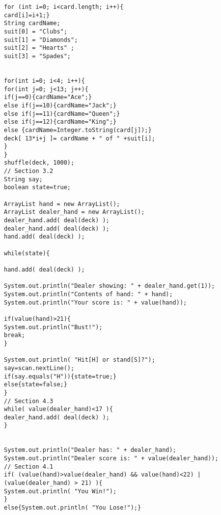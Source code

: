 \documentclass[english]{article}
\begin{document}
\begin{verbatim}
for (int i=0; i<card.length; i++){
card[i]=i+1;} 
String cardName;
suit[0] = "Clubs";
suit[1] = "Diamonds";
suit[2] = "Hearts" ;
suit[3] = "Spades";


for(int i=0; i<4; i++){
for(int j=0; j<13; j++){
if(j==0){cardName="Ace";}
else if(j==10){cardName="Jack";}
else if(j==11){cardName="Queen";}
else if(j==12){cardName="King";}
else {cardName=Integer.toString(card[j]);}
deck[ 13*i+j ]= cardName + " of " +suit[i];
}
}
shuffle(deck, 1000);
// Section 3.2
String say;
boolean state=true;

ArrayList hand = new ArrayList();
ArrayList dealer_hand = new ArrayList();
dealer_hand.add( deal(deck) );
dealer_hand.add( deal(deck) );
hand.add( deal(deck) );

while(state){

hand.add( deal(deck) );

System.out.println("Dealer showing: " + dealer_hand.get(1));
System.out.println("Contents of hand: " + hand);
System.out.println("Your score is: " + value(hand));

if(value(hand)>21){
System.out.println("Bust!");
break;
}

System.out.println( "Hit[H] or stand[S]?");
say=scan.nextLine();
if(say.equals("H")){state=true;}
else{state=false;}
}
// Section 4.3
while( value(dealer_hand)<17 ){
dealer_hand.add( deal(deck) );
}


System.out.println("Dealer has: " + dealer_hand);
System.out.println("Dealer score is: " + value(dealer_hand));
// Section 4.1
if( (value(hand)>value(dealer_hand) && value(hand)<22) | (value(dealer_hand) > 21) ){
System.out.println( "You Win!");
}
else{System.out.println( "You Lose!");}
\end{verbatim}
\end{document}
